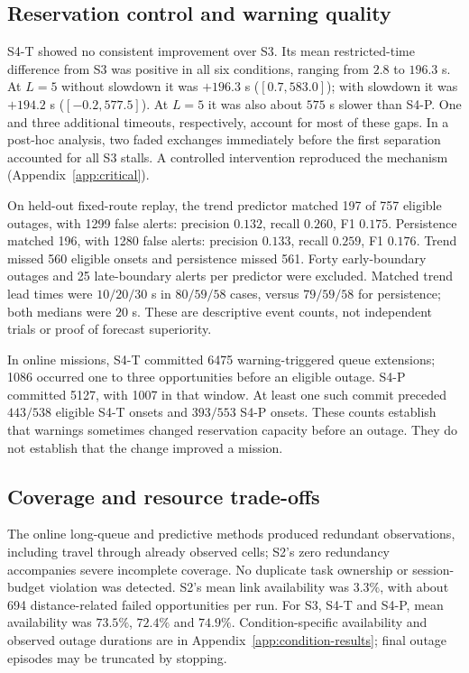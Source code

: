 \subsection{Reservation control and warning quality}
S4-T showed no consistent improvement over S3. Its mean restricted-time difference from S3 was positive in all six conditions, ranging from $2.8$ to $196.3$ s. At $L=5$ without slowdown it was $+196.3$ s ($[0.7,583.0]$); with slowdown it was $+194.2$ s ($[-0.2,577.5]$). At $L=5$ it was also about $575$ s slower than S4-P. One and three additional timeouts, respectively, account for most of these gaps. In a post-hoc analysis, two faded exchanges immediately before the first separation accounted for all S3 stalls. A controlled intervention reproduced the mechanism (Appendix~\ref{app:critical}).

On held-out fixed-route replay, the trend predictor matched 197 of 757 eligible outages, with 1299 false alerts: precision $0.132$, recall $0.260$, F1 $0.175$. Persistence matched 196, with 1280 false alerts: precision $0.133$, recall $0.259$, F1 $0.176$. Trend missed 560 eligible onsets and persistence missed 561. Forty early-boundary outages and 25 late-boundary alerts per predictor were excluded. Matched trend lead times were $10/20/30$ s in $80/59/58$ cases, versus $79/59/58$ for persistence; both medians were $20$ s. These are descriptive event counts, not independent trials or proof of forecast superiority.

In online missions, S4-T committed 6475 warning-triggered queue extensions; 1086 occurred one to three opportunities before an eligible outage. S4-P committed 5127, with 1007 in that window. At least one such commit preceded $443/538$ eligible S4-T onsets and $393/553$ S4-P onsets. These counts establish that warnings sometimes changed reservation capacity before an outage. They do not establish that the change improved a mission.

\subsection{Coverage and resource trade-offs}
The online long-queue and predictive methods produced redundant observations, including travel through already observed cells; S2's zero redundancy accompanies severe incomplete coverage. No duplicate task ownership or session-budget violation was detected. S2's mean link availability was $3.3\%$, with about 694 distance-related failed opportunities per run. For S3, S4-T and S4-P, mean availability was $73.5\%$, $72.4\%$ and $74.9\%$. Condition-specific availability and observed outage durations are in Appendix~\ref{app:condition-results}; final outage episodes may be truncated by stopping.

